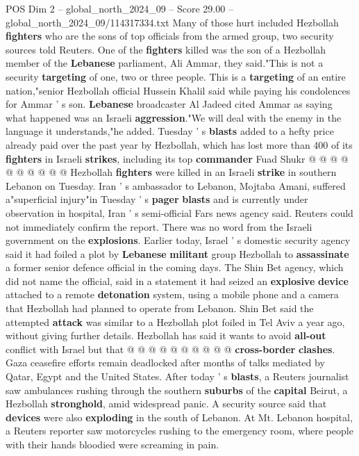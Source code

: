 \begin{textsample}{POS Dim 2 – global\_north\_2024\_09 – Score 29.00 – global\_north\_2024\_09/114317334.txt}
Many of those hurt included Hezbollah \textbf{fighters} who are the sons of top officials from the armed group, two security sources told Reuters.
One of the \textbf{fighters} killed was the son of a Hezbollah member of the \textbf{Lebanese} parliament, Ali Ammar, they said."This is not a security \textbf{targeting} of one, two or three people.
This is a \textbf{targeting} of an entire nation,"senior Hezbollah official Hussein Khalil said while paying his condolences for Ammar ' s son. \textbf{Lebanese} broadcaster Al Jadeed cited Ammar as saying what happened was an Israeli \textbf{aggression}."We will deal with the enemy in the language it understands,"he added.
Tuesday ' s \textbf{blasts} added to a hefty price already paid over the past year by Hezbollah, which has lost more than 400 of its \textbf{fighters} in Israeli \textbf{strikes}, including its top \textbf{commander} Fuad Shukr @ @ @ @ @ @ @ @ @ @ Hezbollah \textbf{fighters} were killed in an Israeli \textbf{strike} in southern Lebanon on Tuesday.
Iran ' s ambassador to Lebanon, Mojtaba Amani, suffered a"superficial injury"in Tuesday ' s \textbf{pager} \textbf{blasts} and is currently under observation in hospital, Iran ' s semi-official Fars news agency said.
Reuters could not immediately confirm the report.
There was no word from the Israeli government on the \textbf{explosions}.
Earlier today, Israel ' s domestic security agency said it had foiled a plot by \textbf{Lebanese} \textbf{militant} group Hezbollah to \textbf{assassinate} a former senior defence official in the coming days.
The Shin Bet agency, which did not name the official, said in a statement it had seized an \textbf{explosive} \textbf{device} attached to a remote \textbf{detonation} system, using a mobile phone and a camera that Hezbollah had planned to operate from Lebanon.
Shin Bet said the attempted \textbf{attack} was similar to a Hezbollah plot foiled in Tel Aviv a year ago, without giving further details.
Hezbollah has said it wants to avoid \textbf{all-out} conflict with Israel but that @ @ @ @ @ @ @ @ @ @ \textbf{cross-border} \textbf{clashes}.
Gaza ceasefire efforts remain deadlocked after months of talks mediated by Qatar, Egypt and the United States.
After today ' s \textbf{blasts}, a Reuters journalist saw ambulances rushing through the southern \textbf{suburbs} of the \textbf{capital} Beirut, a Hezbollah \textbf{stronghold}, amid widespread panic.
A security source said that \textbf{devices} were also \textbf{exploding} in the south of Lebanon.
At Mt.
Lebanon hospital, a Reuters reporter saw motorcycles rushing to the emergency room, where people with their hands bloodied were screaming in pain.

\end{textsample}
